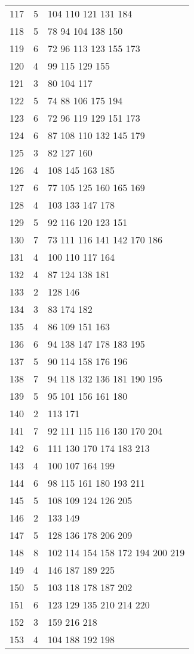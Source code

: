 \documentclass{standalone}
\begin{document}
\begin{tabular}{c c l}
117 & 5 & 104 110 121 131 184 \\
118 & 5 & 78 94 104 138 150 \\
119 & 6 & 72 96 113 123 155 173 \\
120 & 4 & 99 115 129 155 \\
121 & 3 & 80 104 117 \\
122 & 5 & 74 88 106 175 194 \\
123 & 6 & 72 96 119 129 151 173 \\
124 & 6 & 87 108 110 132 145 179 \\
125 & 3 & 82 127 160 \\
126 & 4 & 108 145 163 185 \\
127 & 6 & 77 105 125 160 165 169 \\
128 & 4 & 103 133 147 178 \\
129 & 5 & 92 116 120 123 151 \\
130 & 7 & 73 111 116 141 142 170 186 \\
131 & 4 & 100 110 117 164 \\
132 & 4 & 87 124 138 181 \\
133 & 2 & 128 146 \\
134 & 3 & 83 174 182 \\
135 & 4 & 86 109 151 163 \\
136 & 6 & 94 138 147 178 183 195 \\
137 & 5 & 90 114 158 176 196 \\
138 & 7 & 94 118 132 136 181 190 195 \\
139 & 5 & 95 101 156 161 180 \\
140 & 2 & 113 171 \\
141 & 7 & 92 111 115 116 130 170 204 \\
142 & 6 & 111 130 170 174 183 213 \\
143 & 4 & 100 107 164 199 \\
144 & 6 & 98 115 161 180 193 211 \\
145 & 5 & 108 109 124 126 205 \\
146 & 2 & 133 149 \\
147 & 5 & 128 136 178 206 209 \\
148 & 8 & 102 114 154 158 172 194 200 219 \\
149 & 4 & 146 187 189 225 \\
150 & 5 & 103 118 178 187 202 \\
151 & 6 & 123 129 135 210 214 220 \\
152 & 3 & 159 216 218 \\
153 & 4 & 104 188 192 198 \\

\end{tabular}
\end{document}
